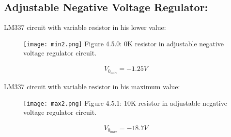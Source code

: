 \subsection{Adjustable Negative Voltage Regulator:}

\begin{tasks}
\task LM337 circuit with variable resistor in his lower value:
\begin{figure}[H]
\texttt{[image: min2.png]}
\centering \linebreak \linebreak Figure 4.5.0: 0K resistor in adjustable negative voltage regulator circuit.
\end{figure}

\begin{ceqn}
\begin{align}
V_{0_{min}} = -1.25 V
\end{align}
\end{ceqn}

\task LM337 circuit with variable resistor in his maximum value:
\begin{figure}[H]
\texttt{[image: max2.png]}
\centering \linebreak \linebreak Figure 4.5.1: 10K resistor in adjustable negative voltage regulator circuit.
\end{figure}

\begin{ceqn}
\begin{align}
V_{0_{max}} = -18.7 V
\end{align}
\end{ceqn}
\end{tasks}

\pagebreak